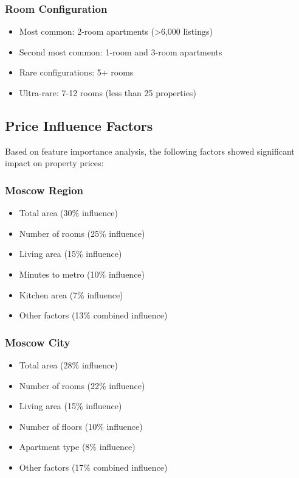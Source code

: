 \documentclass[12pt,a4paper]{report}
\begin{document}
\subsubsection{Room Configuration}
\begin{itemize}
    \item Most common: 2-room apartments (>6,000 listings)
    \item Second most common: 1-room and 3-room apartments
    \item Rare configurations: 5+ rooms
    \item Ultra-rare: 7-12 rooms (less than 25 properties)
\end{itemize}

\subsection{Price Influence Factors}
Based on feature importance analysis, the following factors showed significant impact on property prices:

\subsubsection{Moscow Region}
\begin{itemize}
    \item Total area (30\% influence)
    \item Number of rooms (25\% influence)
    \item Living area (15\% influence)
    \item Minutes to metro (10\% influence)
    \item Kitchen area (7\% influence)
    \item Other factors (13\% combined influence)
\end{itemize}

\subsubsection{Moscow City}
\begin{itemize}
    \item Total area (28\% influence)
    \item Number of rooms (22\% influence)
    \item Living area (15\% influence)
    \item Number of floors (10\% influence)
    \item Apartment type (8\% influence)
    \item Other factors (17\% combined influence)
\end{itemize}
\end{document}
